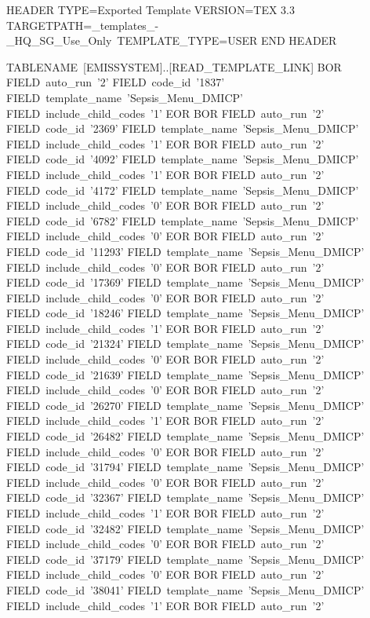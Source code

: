 HEADER
TYPE=Exported Template
VERSION=TEX 3.3
TARGETPATH=\Live_templates_-_HQ_SG_Use_Only\Sepsis\
TEMPLATE_TYPE=USER
END HEADER

TABLENAME~[EMISSYSTEM]..[READ_TEMPLATE_LINK]
  BOR
    FIELD~auto_run~'2'
    FIELD~code_id~'1837'
    FIELD~template_name~'Sepsis_Menu_DMICP'
    FIELD~include_child_codes~'1'
  EOR
  BOR
    FIELD~auto_run~'2'
    FIELD~code_id~'2369'
    FIELD~template_name~'Sepsis_Menu_DMICP'
    FIELD~include_child_codes~'1'
  EOR
  BOR
    FIELD~auto_run~'2'
    FIELD~code_id~'4092'
    FIELD~template_name~'Sepsis_Menu_DMICP'
    FIELD~include_child_codes~'1'
  EOR
  BOR
    FIELD~auto_run~'2'
    FIELD~code_id~'4172'
    FIELD~template_name~'Sepsis_Menu_DMICP'
    FIELD~include_child_codes~'0'
  EOR
  BOR
    FIELD~auto_run~'2'
    FIELD~code_id~'6782'
    FIELD~template_name~'Sepsis_Menu_DMICP'
    FIELD~include_child_codes~'0'
  EOR
  BOR
    FIELD~auto_run~'2'
    FIELD~code_id~'11293'
    FIELD~template_name~'Sepsis_Menu_DMICP'
    FIELD~include_child_codes~'0'
  EOR
  BOR
    FIELD~auto_run~'2'
    FIELD~code_id~'17369'
    FIELD~template_name~'Sepsis_Menu_DMICP'
    FIELD~include_child_codes~'0'
  EOR
  BOR
    FIELD~auto_run~'2'
    FIELD~code_id~'18246'
    FIELD~template_name~'Sepsis_Menu_DMICP'
    FIELD~include_child_codes~'1'
  EOR
  BOR
    FIELD~auto_run~'2'
    FIELD~code_id~'21324'
    FIELD~template_name~'Sepsis_Menu_DMICP'
    FIELD~include_child_codes~'0'
  EOR
  BOR
    FIELD~auto_run~'2'
    FIELD~code_id~'21639'
    FIELD~template_name~'Sepsis_Menu_DMICP'
    FIELD~include_child_codes~'0'
  EOR
  BOR
    FIELD~auto_run~'2'
    FIELD~code_id~'26270'
    FIELD~template_name~'Sepsis_Menu_DMICP'
    FIELD~include_child_codes~'1'
  EOR
  BOR
    FIELD~auto_run~'2'
    FIELD~code_id~'26482'
    FIELD~template_name~'Sepsis_Menu_DMICP'
    FIELD~include_child_codes~'0'
  EOR
  BOR
    FIELD~auto_run~'2'
    FIELD~code_id~'31794'
    FIELD~template_name~'Sepsis_Menu_DMICP'
    FIELD~include_child_codes~'0'
  EOR
  BOR
    FIELD~auto_run~'2'
    FIELD~code_id~'32367'
    FIELD~template_name~'Sepsis_Menu_DMICP'
    FIELD~include_child_codes~'1'
  EOR
  BOR
    FIELD~auto_run~'2'
    FIELD~code_id~'32482'
    FIELD~template_name~'Sepsis_Menu_DMICP'
    FIELD~include_child_codes~'0'
  EOR
  BOR
    FIELD~auto_run~'2'
    FIELD~code_id~'37179'
    FIELD~template_name~'Sepsis_Menu_DMICP'
    FIELD~include_child_codes~'0'
  EOR
  BOR
    FIELD~auto_run~'2'
    FIELD~code_id~'38041'
    FIELD~template_name~'Sepsis_Menu_DMICP'
    FIELD~include_child_codes~'1'
  EOR
  BOR
    FIELD~auto_run~'2'
